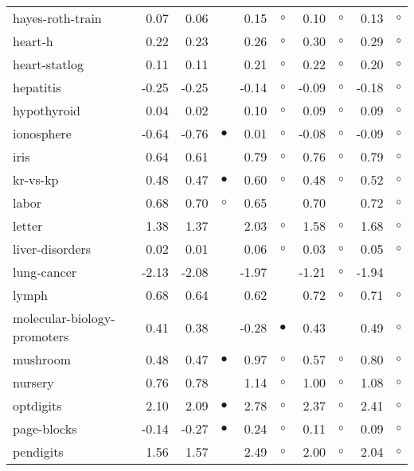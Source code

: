 \begin{table}[thb]
{\begin{tabular}{lrr@{\hspace{0.1cm}}cr@{\hspace{0.1cm}}cr@{\hspace{0.1cm}}cr@{\hspace{0.1cm}}c}
hayes-roth-train &  0.07 &  0.06 &           &  0.15 &   $\circ$ &  0.10 &   $\circ$ &  0.13 &   $\circ$\\
heart-h &  0.22 &  0.23 &           &  0.26 &   $\circ$ &  0.30 &   $\circ$ &  0.29 &   $\circ$\\
heart-statlog &  0.11 &  0.11 &           &  0.21 &   $\circ$ &  0.22 &   $\circ$ &  0.20 &   $\circ$\\
hepatitis & -0.25 & -0.25 &           & -0.14 &   $\circ$ & -0.09 &   $\circ$ & -0.18 &   $\circ$\\
hypothyroid &  0.04 &  0.02 &           &  0.10 &   $\circ$ &  0.09 &   $\circ$ &  0.09 &   $\circ$\\
ionosphere & -0.64 & -0.76 & $\bullet$ &  0.01 &   $\circ$ & -0.08 &   $\circ$ & -0.09 &   $\circ$\\
iris &  0.64 &  0.61 &           &  0.79 &   $\circ$ &  0.76 &   $\circ$ &  0.79 &   $\circ$\\
kr-vs-kp &  0.48 &  0.47 & $\bullet$ &  0.60 &   $\circ$ &  0.48 &   $\circ$ &  0.52 &   $\circ$\\
labor &  0.68 &  0.70 &   $\circ$ &  0.65 &           &  0.70 &           &  0.72 &   $\circ$\\
letter &  1.38 &  1.37 &           &  2.03 &   $\circ$ &  1.58 &   $\circ$ &  1.68 &   $\circ$\\
liver-disorders &  0.02 &  0.01 &           &  0.06 &   $\circ$ &  0.03 &   $\circ$ &  0.05 &   $\circ$\\
lung-cancer & -2.13 & -2.08 &           & -1.97 &           & -1.21 &   $\circ$ & -1.94 &          \\
lymph &  0.68 &  0.64 &           &  0.62 &           &  0.72 &   $\circ$ &  0.71 &   $\circ$\\
molecular-biology-promoters &  0.41 &  0.38 &           & -0.28 & $\bullet$ &  0.43 &           &  0.49 &   $\circ$\\
mushroom &  0.48 &  0.47 & $\bullet$ &  0.97 &   $\circ$ &  0.57 &   $\circ$ &  0.80 &   $\circ$\\
nursery &  0.76 &  0.78 &           &  1.14 &   $\circ$ &  1.00 &   $\circ$ &  1.08 &   $\circ$\\
optdigits &  2.10 &  2.09 & $\bullet$ &  2.78 &   $\circ$ &  2.37 &   $\circ$ &  2.41 &   $\circ$\\
page-blocks & -0.14 & -0.27 & $\bullet$ &  0.24 &   $\circ$ &  0.11 &   $\circ$ &  0.09 &   $\circ$\\
pendigits &  1.56 &  1.57 &           &  2.49 &   $\circ$ &  2.00 &   $\circ$ &  2.04 &   $\circ$\\

\end{tabular}}
\end{table}
